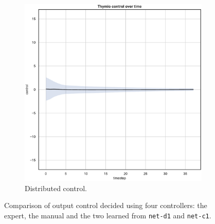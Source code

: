 \begin{figure}[!htb]
\begin{center}
\begin{subfigure}[h]{0.35\textwidth}
			\includegraphics[width=\textwidth]{contents/images/net-d1/control-overtime-learned_distributed}
			\caption{Distributed control.}
		\end{subfigure}
	\end{center}
	\caption[Evaluation of the control decided by \texttt{net-c1}.]{Comparison of 
	output control decided using four controllers: the expert, the manual and the 
	two learned from \texttt{net-d1} and \texttt{net-c1}.}
\end{figure}

